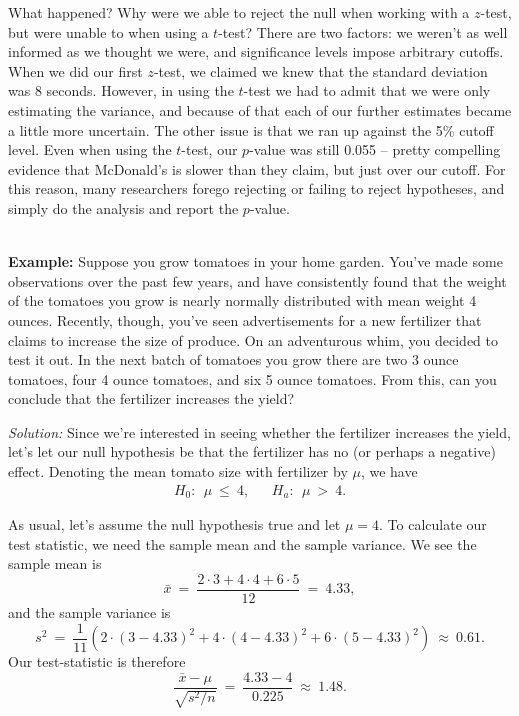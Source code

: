 What happened? Why were we able to reject the null when working with a $z$-test, but were unable to when using a $t$-test? There are two factors: we weren't as well informed as we thought we were, and significance levels impose arbitrary cutoffs. When we did our first $z$-test, we claimed we knew that the standard deviation was 8 seconds. However, in using the $t$-test we had to admit that we were only estimating the variance, and because of that each of our further estimates became a little more uncertain. The other issue is that we ran up against the 5\% cutoff level. Even when using the $t$-test, our $p$-value was still 0.055 -- pretty compelling evidence that McDonald's is slower than they claim, but just over our cutoff. For this reason, many researchers forego rejecting or failing to reject hypotheses, and simply do the analysis and report the $p$-value.

\ \\

\textbf{Example:} \ex Suppose you grow tomatoes in your home garden.  You've made some observations over the past few years, and have consistently found that the weight of the tomatoes you grow is nearly normally distributed with mean weight 4 ounces.  Recently, though, you've seen advertisements for a new fertilizer that claims to increase the size of produce.  On an adventurous whim, you decided to test it out.  In the next batch of tomatoes you grow there are two 3 ounce tomatoes, four 4 ounce tomatoes, and six 5 ounce tomatoes.  From this, can you conclude that the fertilizer increases the yield?

\emph{Solution:} Since we're interested in seeing whether the fertilizer increases the yield, let's let our null hypothesis be that the fertilizer has no (or perhaps a negative) effect.  Denoting the mean tomato size with fertilizer by $\mu$, we have
\begin{eqnarray}
H_0: \ \ \mu\ \leq\ 4, \ \ \ \ \ \ \ H_a:\ \  \mu\ >\ 4.
\end{eqnarray}

As usual, let's assume the null hypothesis true and let $\mu = 4$. To calculate our test statistic, we need the sample mean and the sample variance.  We see the sample mean is
\begin{equation*}
\bar{x} \ = \  \frac{2\cdot3+4\cdot4+6\cdot5}{12}\ = \ 4.33,
\end{equation*}
and the sample variance is
\begin{equation*}
s^2 \ = \  \frac{1}{11}\left(2\cdot(3-4.33)^2+4\cdot(4-4.33)^2+6\cdot(5-4.33)^2\right)\ \approx \  0.61.
\end{equation*}
Our test-statistic is therefore
\begin{equation*}
\frac{\bar{x}-\mu}{\sqrt{s^2/n}} \ = \  \frac{4.33-4}{0.225} \ \approx \  1.48.
\end{equation*}


